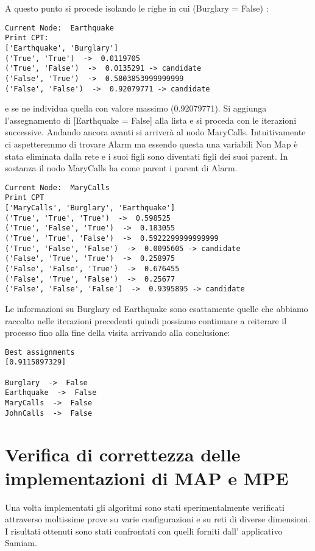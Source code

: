 A questo punto si procede isolando le righe in cui (Burglary = False) :

\lstset{language=Octave,basicstyle=\ttfamily}
\begin{lstlisting}[frame=single]
Current Node:  Earthquake
Print CPT: 
['Earthquake', 'Burglary']
('True', 'True')  ->  0.0119705
('True', 'False')  ->  0.0135291 -> candidate 
('False', 'True')  ->  0.5803853999999999
('False', 'False')  ->  0.92079771 -> candidate 
\end{lstlisting}

e se ne individua quella con valore massimo (0.92079771). Si aggiunga l’assegnamento di [Earthquake = False] alla lista e si proceda con le iterazioni successive. Andando ancora avanti si arriverà al nodo MaryCalls. Intuitivamente ci aspetteremmo di trovare Alarm ma essendo questa una variabili Non Map è stata eliminata dalla rete e i suoi figli sono diventati figli dei suoi parent. In sostanza il nodo MaryCalls ha come parent i parent di Alarm.

\lstset{language=Octave,basicstyle=\ttfamily}
\begin{lstlisting}[frame=single]
Current Node:  MaryCalls
Print CPT
['MaryCalls', 'Burglary', 'Earthquake']
('True', 'True', 'True')  ->  0.598525
('True', 'False', 'True')  ->  0.183055
('True', 'True', 'False')  ->  0.5922299999999999
('True', 'False', 'False')  ->  0.0095605 -> candidate 
('False', 'True', 'True')  ->  0.258975
('False', 'False', 'True')  ->  0.676455
('False', 'True', 'False')  ->  0.25677
('False', 'False', 'False')  ->  0.9395895 -> candidate 
\end{lstlisting}

Le informazioni su Burglary ed Earthquake sono esattamente quelle che abbiamo raccolto nelle iterazioni precedenti quindi possiamo continuare a reiterare il processo fino alla fine della visita arrivando alla conclusione:

\lstset{language=Octave,basicstyle=\ttfamily}
\begin{lstlisting}[frame=single]
Best assignments
[0.9115897329]

Burglary  ->  False
Earthquake  ->  False
MaryCalls  ->  False
JohnCalls  ->  False
\end{lstlisting}

\section{Verifica di correttezza delle implementazioni di MAP e MPE}
Una volta implementati gli algoritmi sono stati sperimentalmente verificati attraverso moltissime prove su varie configurazioni e su reti di diverse dimensioni. I risultati ottenuti sono stati confrontati con quelli forniti dall’ applicativo Samiam.






